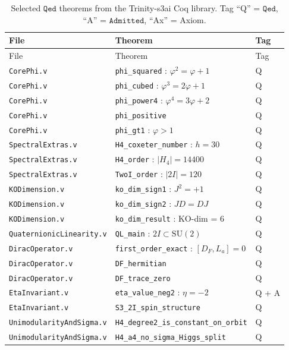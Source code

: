 \documentclass[12pt,a4paper]{article}
\newcommand{\TwoI}{2I}
\newcommand{\Qed}{\texttt{Qed}}
\newcommand{\Admitted}{\texttt{Admitted}}
\begin{document}
\begin{longtable}{lll}
  \caption{Selected \(\Qed\) theorems from the Trinity-s3ai Coq library.
    Tag ``Q'' = \(\Qed\), ``A'' = \(\Admitted\), ``Ax'' = Axiom.}
  \label{tab:coq_theorems}\\
  \toprule
  File & Theorem & Tag \\
  \midrule
  \endfirsthead
  \toprule
  File & Theorem & Tag \\
  \midrule
  \endhead
  \bottomrule
  \endfoot
  \texttt{CorePhi.v} & \texttt{phi\_squared} : \(\varphi^2 = \varphi + 1\) & Q \\
  \texttt{CorePhi.v} & \texttt{phi\_cubed} : \(\varphi^3 = 2\varphi + 1\) & Q \\
  \texttt{CorePhi.v} & \texttt{phi\_power4} : \(\varphi^4 = 3\varphi + 2\) & Q \\
  \texttt{CorePhi.v} & \texttt{phi\_positive} & Q \\
  \texttt{CorePhi.v} & \texttt{phi\_gt1} : \(\varphi > 1\) & Q \\
  \texttt{SpectralExtras.v} & \texttt{H4\_coxeter\_number} : \(h = 30\) & Q \\
  \texttt{SpectralExtras.v} & \texttt{H4\_order} : \(|H_4| = 14400\) & Q \\
  \texttt{SpectralExtras.v} & \texttt{TwoI\_order} : \(|\TwoI| = 120\) & Q \\
  \texttt{KODimension.v} & \texttt{ko\_dim\_sign1} : \(J^2 = +1\) & Q \\
  \texttt{KODimension.v} & \texttt{ko\_dim\_sign2} : \(JD = DJ\) & Q \\
  \texttt{KODimension.v} & \texttt{ko\_dim\_result} : KO-dim = 6 & Q \\
  \texttt{QuaternionicLinearity.v} & \texttt{QL\_main} : \(\TwoI \subset \mathrm{SU}(2)\) & Q \\
  \texttt{DiracOperator.v} & \texttt{first\_order\_exact} : \([D_F, L_a] = 0\) & Q \\
  \texttt{DiracOperator.v} & \texttt{DF\_hermitian} & Q \\
  \texttt{DiracOperator.v} & \texttt{DF\_trace\_zero} & Q \\
  \texttt{EtaInvariant.v} & \texttt{eta\_value\_neg2} : \(\eta = -2\) & Q + A \\
  \texttt{EtaInvariant.v} & \texttt{S3\_2I\_spin\_structure} & Q \\
  \texttt{UnimodularityAndSigma.v} & \texttt{H4\_degree2\_is\_constant\_on\_orbit} & Q \\
  \texttt{UnimodularityAndSigma.v} & \texttt{H4\_a4\_no\_sigma\_Higgs\_split} & Q \\

\end{longtable}
\end{document}
